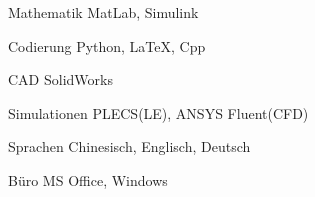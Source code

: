 

\begin{cvskills}

  \cvskill
    {Mathematik} %
    {MatLab, Simulink} %
    
  \cvskill
    {Codierung} %
    {Python, \LaTeX, Cpp} %

  \cvskill
    {CAD} %
    {SolidWorks} %

  \cvskill
    {Simulationen} %
    {PLECS(LE), ANSYS Fluent(CFD)} %

  \cvskill
    {Sprachen} %
    {Chinesisch, Englisch, Deutsch} %
    
  \cvskill
    {Büro} %
    {MS Office, Windows} %

\end{cvskills}
